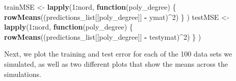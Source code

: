 \documentclass[
]{article}
\newenvironment{Shaded}{\begin{snugshade}}{\end{snugshade}}
\newcommand{\ControlFlowTok}[1]{\textcolor[rgb]{0.13,0.29,0.53}{\textbf{#1}}}
\newcommand{\DecValTok}[1]{\textcolor[rgb]{0.00,0.00,0.81}{#1}}
\newcommand{\FunctionTok}[1]{\textcolor[rgb]{0.13,0.29,0.53}{\textbf{#1}}}
\newcommand{\NormalTok}[1]{#1}
\newcommand{\OtherTok}[1]{\textcolor[rgb]{0.56,0.35,0.01}{#1}}
\newcommand{\SpecialCharTok}[1]{\textcolor[rgb]{0.81,0.36,0.00}{\textbf{#1}}}
\begin{document}
\begin{Shaded}
\begin{Highlighting}[]
\NormalTok{trainMSE }\OtherTok{\textless{}{-}} \FunctionTok{lapply}\NormalTok{(}\DecValTok{1}\SpecialCharTok{:}\NormalTok{nord, }
                   \ControlFlowTok{function}\NormalTok{(poly\_degree) \{}
                     \FunctionTok{rowMeans}\NormalTok{((predictions\_list[[poly\_degree]] }\SpecialCharTok{{-}}\NormalTok{ ymat)}\SpecialCharTok{\^{}}\DecValTok{2}\NormalTok{)}
\NormalTok{                   \}}
\NormalTok{)}
\NormalTok{testMSE }\OtherTok{\textless{}{-}} \FunctionTok{lapply}\NormalTok{(}\DecValTok{1}\SpecialCharTok{:}\NormalTok{nord, }
                  \ControlFlowTok{function}\NormalTok{(poly\_degree) \{}
                    \FunctionTok{rowMeans}\NormalTok{((predictions\_list[[poly\_degree]] }\SpecialCharTok{{-}}\NormalTok{ testymat)}\SpecialCharTok{\^{}}\DecValTok{2}\NormalTok{)}
\NormalTok{                  \}}
\NormalTok{)}
\end{Highlighting}
\end{Shaded}

Next, we plot the training and test error for each of the 100 data sets
we simulated, as well as two different plots that show the means across
the simulations.
\end{document}
